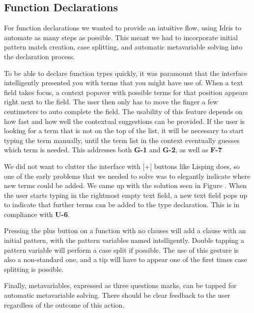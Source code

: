 
\subsection{Function Declarations}
For function declarations we wanted to provide an intuitive flow, using Idris to automate as many steps as possible. 
This meant we had to incorporate initial pattern match creation, case splitting, and automatic metavariable solving into the declaration process.

To be able to declare function types quickly, it was paramount that the interface intelligently presented you with terms that you might have use of.
When a text field takes focus, a context popover with possible terms for that position appears right next to the field. 
The user then only has to move the finger a few centimeters to auto complete the field. 
The usability of this feature depends on how fast and how well the contextual suggestions can be provided.
If the user is looking for a term that is not on the top of the list, it will be necessary to start typing the term manually, until the term list in the context eventually guesses which term is needed. This addresses both \textbf{G-1} and \textbf{G-2}, as well as \textbf{F-7}


We did not want to clutter the interface with [+] buttons like Lisping does, so one of the early problems that we needed to solve was to elegantly indicate where new terms could be added.
We came up with the solution seen in Figure .
When the user starts typing in the rightmost empty text field, a new text field pops up to indicate that further terms can be added to the type declaration. This is in compliance with \textbf{U-6}.

\missingfigure{}

Pressing the plus button on a function with no clauses will add a clause with an initial pattern, with the pattern variables named intelligently. 
Double tapping a pattern variable will perform a case split if possible. 
The use of this gesture is also a non-standard one, and a tip will have to appear one of the first times case splitting is possible.

Finally, metavariables, expressed as three questions marks, can be tapped for automatic metavariable solving. 
There should be clear feedback to the user regardless of the outcome of this action.

